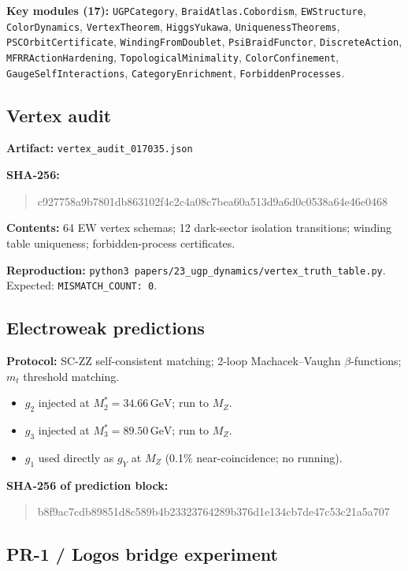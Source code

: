 \documentclass[12pt]{article}
\theoremstyle{remark}
\begin{document}
\textbf{Key modules (17):}
\texttt{UGPCategory}, \texttt{BraidAtlas.Cobordism}, \texttt{EWStructure},
\texttt{ColorDynamics}, \texttt{VertexTheorem}, \texttt{HiggsYukawa},
\texttt{Uniqueness\-Theorems}, \texttt{PSCOrbitCertificate},
\texttt{WindingFromDoublet}, \texttt{PsiBraidFunctor}, \texttt{DiscreteAction},
\texttt{MFRRAction\-Hardening}, \texttt{TopologicalMinimality},
\texttt{ColorConfinement}, \texttt{GaugeSelfInteractions},
\texttt{CategoryEnrichment}, \texttt{ForbiddenProcesses}.

\subsection{Vertex audit}

\textbf{Artifact:} \texttt{vertex\_audit\_017035.json}

\textbf{SHA-256:}
\begin{quote}\small\ttfamily
c927758a9b7801db863102f4c2c4a08c7bea60a513d9a6d0c0538a64e46e0468
\end{quote}

\textbf{Contents:} 64 EW vertex schemas; 12 dark-sector isolation transitions;
winding table uniqueness; forbidden-process certificates.

\textbf{Reproduction:} \texttt{python3 papers/23\_ugp\_dynamics/vertex\_truth\_table.py}.
Expected: \texttt{MISMATCH\_COUNT: 0}.

\subsection{Electroweak predictions}

\textbf{Protocol:} SC-ZZ self-consistent matching; 2-loop Machacek--Vaughn
$\beta$-functions; $m_t$ threshold matching.
\begin{itemize}
  \item $g_2$ injected at $M_2^* = 34.66\,\mathrm{GeV}$; run to $M_Z$.
  \item $g_3$ injected at $M_3^* = 89.50\,\mathrm{GeV}$; run to $M_Z$.
  \item $g_1$ used directly as $g_Y$ at $M_Z$ (0.1\% near-coincidence; no running).
\end{itemize}

\textbf{SHA-256 of prediction block:}
\begin{quote}\small\ttfamily
b8f9ac7cdb89851d8c589b4b23323764289b376d1e134cb7de47c53c21a5a707
\end{quote}

\subsection{PR-1 / Logos bridge experiment}
\end{document}
